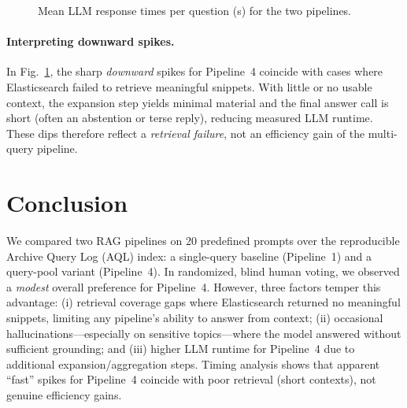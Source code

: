 \documentclass[manuscript,screen]{acmart}
\begin{document}
\begin{CCSXML}
\begin{figure}[H]
\caption{Mean LLM response times per question (s) for the two pipelines.}
\label{fig:time-per-question}
\end{figure}

\paragraph{Interpreting downward spikes.}
In Fig.~\ref{fig:time-per-question}, the sharp \emph{downward} spikes for
Pipeline~4 coincide with cases where Elasticsearch failed to retrieve
meaningful snippets. With little or no usable context, the expansion step
yields minimal material and the final answer call is short (often an abstention
or terse reply), reducing measured LLM runtime. These dips therefore reflect a
\emph{retrieval failure}, not an efficiency gain of the multi-query
pipeline.

\section{Conclusion}
\label{sec:conclusion}

We compared two RAG pipelines on 20 predefined prompts over the reproducible
Archive Query Log (AQL) index: a single-query baseline (Pipeline~1) and a
query-pool variant (Pipeline~4). In randomized, blind human voting, we observed
a \emph{modest} overall preference for Pipeline~4. However, three factors
temper this advantage: (i) retrieval coverage gaps where Elasticsearch returned
no meaningful snippets, limiting any pipeline’s ability to answer from context;
(ii) occasional hallucinations—especially on sensitive topics—where the model
answered without sufficient grounding; and (iii) higher LLM runtime for
Pipeline~4 due to additional expansion/aggregation steps. Timing analysis shows
that apparent “fast” spikes for Pipeline~4 coincide with poor retrieval (short
contexts), not genuine efficiency gains.


\end{CCSXML}
\end{document}
